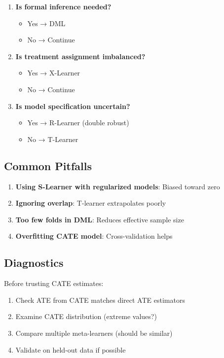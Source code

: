 \begin{enumerate}
    \item \textbf{Is formal inference needed?}
    \begin{itemize}
        \item Yes → DML
        \item No → Continue
    \end{itemize}

    \item \textbf{Is treatment assignment imbalanced?}
    \begin{itemize}
        \item Yes → X-Learner
        \item No → Continue
    \end{itemize}

    \item \textbf{Is model specification uncertain?}
    \begin{itemize}
        \item Yes → R-Learner (double robust)
        \item No → T-Learner
    \end{itemize}
\end{enumerate}

\subsection{Common Pitfalls}

\begin{enumerate}
    \item \textbf{Using S-Learner with regularized models}: Biased toward zero
    \item \textbf{Ignoring overlap}: T-learner extrapolates poorly
    \item \textbf{Too few folds in DML}: Reduces effective sample size
    \item \textbf{Overfitting CATE model}: Cross-validation helps
\end{enumerate}

\subsection{Diagnostics}

Before trusting CATE estimates:
\begin{enumerate}
    \item Check ATE from CATE matches direct ATE estimators
    \item Examine CATE distribution (extreme values?)
    \item Compare multiple meta-learners (should be similar)
    \item Validate on held-out data if possible
\end{enumerate}


